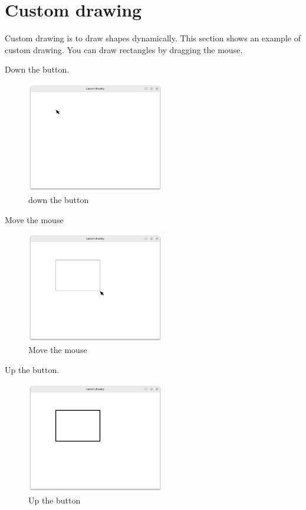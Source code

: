 \section{Custom drawing}\label{custom-drawing}

Custom drawing is to draw shapes dynamically. This section shows an
example of custom drawing. You can draw rectangles by dragging the
mouse.

Down the button.

\begin{figure}
\centering
\includegraphics[width=6cm,height=4.83cm]{../image/cd0.png}
\caption{down the button}
\end{figure}

Move the mouse

\begin{figure}
\centering
\includegraphics[width=6cm,height=4.83cm]{../image/cd1.png}
\caption{Move the mouse}
\end{figure}

Up the button.

\begin{figure}
\centering
\includegraphics[width=6cm,height=4.83cm]{../image/cd2.png}
\caption{Up the button}
\end{figure}

